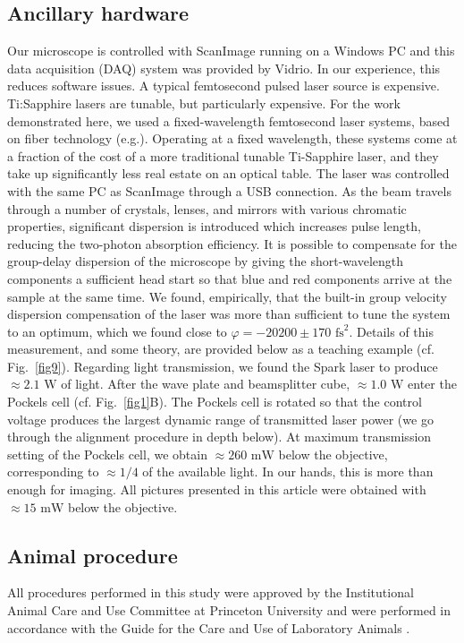 \documentclass[10pt,letterpaper]{article}
\begin{document}
\subsection*{Ancillary hardware}
Our microscope is controlled with ScanImage \cite{Pologruto2003} running on a Windows PC and this data acquisition (DAQ) system was provided by Vidrio. In our experience, this reduces software issues.\newline
A typical femtosecond pulsed laser source is expensive. Ti:Sapphire lasers are tunable, but particularly expensive. For the work demonstrated here, we used a fixed-wavelength femtosecond laser systems, based on fiber technology (e.g.\cite{Bueno2019,Limpert2006,Wise2012,Young2015}). Operating at a fixed wavelength, these systems come at a fraction of the cost of a more traditional tunable Ti-Sapphire laser, and they take up significantly less real estate on an optical table. The laser was controlled with the same PC as ScanImage through a USB connection. As the beam travels through a number of crystals, lenses, and mirrors with various chromatic properties, significant dispersion is introduced which increases pulse length, reducing the two-photon absorption efficiency. It is possible to compensate for the group-delay dispersion of the microscope by giving the short-wavelength components a sufficient head start so that blue and red components arrive at the sample at the same time. We found, empirically, that the built-in group velocity dispersion compensation of the laser was more than sufficient to tune the system to an optimum, which we found close to $\varphi=-20200\pm170\text{ fs}^2$. Details of this measurement, and some theory, are provided below as a teaching example (cf. Fig.~\ref{fig9}). Regarding light transmission, we found the Spark laser to produce $\approx 2.1\text{ W}$ of light. After the wave plate and beamsplitter cube, $\approx 1.0\text{ W}$ enter the Pockels cell (cf. Fig.~\ref{fig1}B). The Pockels cell is rotated so that the control voltage produces the largest dynamic range of transmitted laser power (we go through the alignment procedure in depth below). At maximum transmission setting of the Pockels cell, we obtain $\approx 260\text{ mW}$ below the objective, corresponding to $\approx1/4$ of the available light. In our hands, this is more than enough for imaging. All pictures presented in this article were obtained with $\approx 15\text{ mW}$ below the objective.

\subsection*{Animal procedure}
All procedures performed in this study were approved by the Institutional Animal Care and Use Committee at Princeton University and were performed in accordance with the Guide for the Care and Use of Laboratory Animals \cite{Guide2011}.
\end{document}
